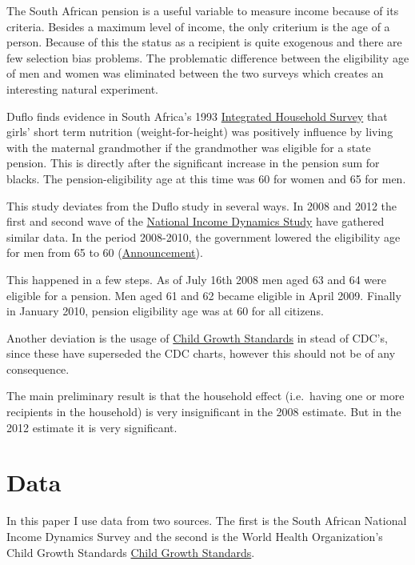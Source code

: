 \documentclass[a4paper]{book}\usepackage{graphicx, color}
\begin{document}
The South African pension is a useful variable to measure income because
of its criteria. Besides a maximum level of income, the only criterium
is the age of a person. Because of this the status as a recipient is
quite exogenous and there are few selection bias problems. The
problematic difference between the eligibility age of men and women was
eliminated between the two surveys which creates an interesting natural
experiment.

Duflo finds evidence in South Africa's 1993
\href{http://microdata.worldbank.org/index.php/catalog/297}{Integrated
Household Survey} that girls' short term nutrition (weight-for-height)
was positively influence by living with the maternal grandmother if the
grandmother was eligible for a state pension. This is directly after the
significant increase in the pension sum for blacks. The
pension-eligibility age at this time was 60 for women and 65 for men.

This study deviates from the Duflo study in several ways. In 2008 and
2012 the first and second wave of the
\href{http://www.nids.uct.ac.za/home/}{National Income Dynamics Study}
have gathered similar data. In the period 2008-2010, the government
lowered the eligibility age for men from 65 to 60
(\href{http://www.southafrica.info/services/government/pension-160708.htm}{Announcement}).

This happened in a few steps. As of July 16th 2008 men aged 63 and 64
were eligible for a pension. Men aged 61 and 62 became eligible in April
2009. Finally in January 2010, pension eligibility age was at 60 for all
citizens.

Another deviation is the usage of
\href{http://www.who.int/childgrowth/en/}{Child Growth Standards} in
stead of CDC's, since these have superseded the CDC charts, however this
should not be of any consequence.

The main preliminary result is that the household effect (i.e.~having
one or more recipients in the household) is very insignificant in the
2008 estimate. But in the 2012 estimate it is very significant.

\section{Data}

In this paper I use data from two sources. The first is the South
African National Income Dynamics Survey and the second is the World
Health Organization's Child Growth Standards
\href{http://www.who.int/childgrowth/en/}{Child Growth Standards}.
\end{document}
